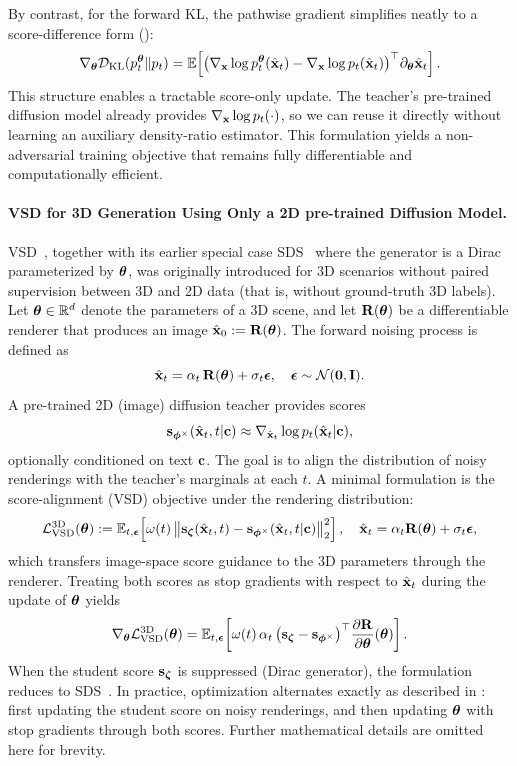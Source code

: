 By contrast, for the forward KL, the pathwise gradient simplifies neatly to a score-difference form ():
\[
\nabla_{{\bm{\theta}}}\mathcal{D}_{\mathrm{KL}}(p_t^{{\bm{\theta}}}\|p_t)
= \mathbb{E}\!\left[
  \big(\nabla_{{\mathbf{x}}}\log p_t^{{\bm{\theta}}}(\hat{{\mathbf{x}}}_t)
  - \nabla_{{\mathbf{x}}}\log p_t(\hat{{\mathbf{x}}}_t)\big)^\top
  \partial_{{\bm{\theta}}}\hat{{\mathbf{x}}}_t
\right].
\]
This structure enables a tractable score-only update. The teacher’s
pre-trained diffusion model already provides $\nabla_{{\mathbf{x}}}\log p_t(\cdot)$,
so we can reuse it directly without learning an auxiliary density-ratio
estimator. This formulation yields a non-adversarial training objective that remains fully
differentiable and computationally efficient.

\paragraph{VSD for 3D Generation Using Only a 2D pre-trained Diffusion Model.}
VSD~\citep{wang2023prolificdreamer}, together with its earlier special case SDS~\citep{pooledreamfusion} where the generator is a Dirac parameterized by ${\bm{\theta}}$, was originally introduced for 3D scenarios without paired supervision between 3D and 2D data (that is, without ground-truth 3D labels). 
Let ${\bm{\theta}}\in\mathbb{R}^d$ denote the parameters of a 3D scene, and let ${\mathbf{R}}({\bm{\theta}})$ be a differentiable renderer that produces an image $\hat{{\mathbf{x}}}_0:={\mathbf{R}}({\bm{\theta}})$. 
The forward noising process is defined as
\[
\hat{{\mathbf{x}}}_t=\alpha_t\,{\mathbf{R}}({\bm{\theta}})+\sigma_t{\bm{\epsilon}},\quad {\bm{\epsilon}}\sim\mathcal N(\bm 0,{\mathbf{I}}).
\]
A pre-trained 2D (image) diffusion teacher provides scores
\[
{\mathbf{s}}_{{\bm{\phi}}^\times}(\hat{{\mathbf{x}}}_t,t|{\mathbf{c}})\approx\nabla_{\hat{{\mathbf{x}}}_t}\log p_t(\hat{{\mathbf{x}}}_t|{\mathbf{c}}),
\]
optionally conditioned on text ${\mathbf{c}}$. 
The goal is to align the distribution of noisy renderings with the teacher’s marginals at each $t$. 
A minimal formulation is the score-alignment (VSD) objective under the rendering distribution:
\[
\mathcal{L}^{\text{3D}}_{\text{VSD}}({\bm{\theta}})
:=\mathbb{E}_{t,{\bm{\epsilon}}}\!\left[\omega(t)\,\big\|
{\mathbf{s}}_{\bm{\zeta}}(\hat{{\mathbf{x}}}_t,t)-{\mathbf{s}}_{{\bm{\phi}}^\times}(\hat{{\mathbf{x}}}_t,t|{\mathbf{c}})
\big\|_2^2\right],
\quad \hat{{\mathbf{x}}}_t=\alpha_t{\mathbf{R}}({\bm{\theta}})+\sigma_t{\bm{\epsilon}},
\]
which transfers image-space score guidance to the 3D parameters through the renderer. 
Treating both scores as stop gradients with respect to $\hat{{\mathbf{x}}}_t$ during the update of ${\bm{\theta}}$ yields
\[
\nabla_{{\bm{\theta}}}\mathcal{L}^{\text{3D}}_{\text{VSD}}({\bm{\theta}})
=\mathbb{E}_{t,{\bm{\epsilon}}}\!\left[\omega(t)\,\alpha_t\,
\big({\mathbf{s}}_{\bm{\zeta}}-{\mathbf{s}}_{{\bm{\phi}}^\times}\big)^\top
\frac{\partial {\mathbf{R}}}{\partial{\bm{\theta}}}({\bm{\theta}})\right].
\]
When the student score ${\mathbf{s}}_{\bm{\zeta}}$ is suppressed (Dirac generator), the formulation reduces to SDS~\citep{pooledreamfusion}. 
In practice, optimization alternates exactly as described in : first updating the student score on noisy renderings, and then updating ${\bm{\theta}}$ with stop gradients through both scores. 
Further mathematical details are omitted here for brevity.




